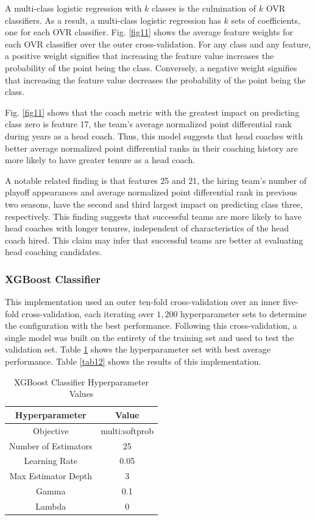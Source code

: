 \documentclass[conference]{IEEEtran}
\begin{document}
A multi-class logistic regression with $k$ classes is the culmination of $k$ OVR classifiers. As a result, a multi-class logistic regression has $k$ sets of coefficients, one for each OVR classifier. Fig. \ref{fig11} shows the average feature weights for each OVR classifier over the outer cross-validation. For any class and any feature, a positive weight signifies that increasing the feature value increases the probability of the point being the class. Conversely, a negative weight signifies that increasing the feature value decreases the probability of the point being the class. 

Fig. \ref{fig11} shows that the coach metric with the greatest impact on predicting class zero is feature 17, the team's average normalized point differential rank during years as a head coach. Thus, this model suggests that head coaches with better average normalized point differential ranks in their coaching history are more likely to have greater tenure as a head coach. 

A notable related finding is that features 25 and 21, the hiring team's number of playoff appearances and average normalized point differential rank in previous two seasons, have the second and third largest impact on predicting class three, respectively. This finding suggests that successful teams are more likely to have head coaches with longer tenures, independent of characteristics of the head coach hired. This claim may infer that successful teams are better at evaluating head coaching candidates. 

\subsubsection{XGBoost Classifier}
This implementation used an outer ten-fold cross-validation over an inner five-fold cross-validation, each iterating over $1,200$ hyperparameter sets to determine the configuration with the best performance. Following this cross-validation, a single model was built on the entirety of the training set and used to test the validation set. Table \ref{tab11} shows the hyperparameter set with best average performance. Table \ref{tab12} shows the results of this implementation.

\begin{table}[htbp]
\caption{XGBoost Classifier Hyperparameter Values}
\begin{center}
\begin{tabular}{|c||c|}
\hline
\textbf{Hyperparameter} & \textbf{Value} \\
\hline
\hline
Objective & multi:softprob \\
\hline
Number of Estimators & 25 \\
\hline
Learning Rate & 0.05 \\
\hline
Max Estimator Depth & 3 \\
\hline
Gamma & 0.1 \\
\hline
Lambda & 0 \\
\hline
\end{tabular}
\label{tab11}
\end{center}
\end{table}
\end{document}
